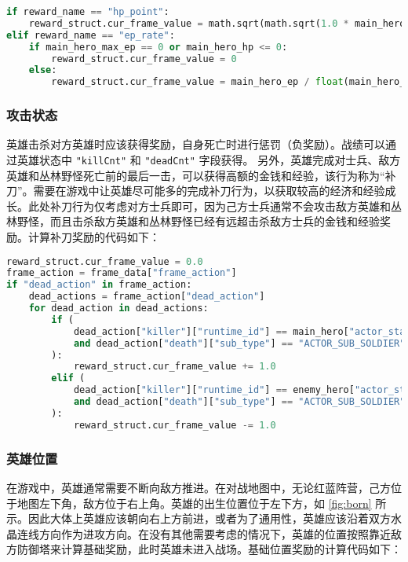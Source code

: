 \begin{lstlisting}[language=Python]
if reward_name == "hp_point":
    reward_struct.cur_frame_value = math.sqrt(math.sqrt(1.0 * main_hero_hp / main_hero_max_hp))
elif reward_name == "ep_rate":
    if main_hero_max_ep == 0 or main_hero_hp <= 0:
        reward_struct.cur_frame_value = 0
    else:
        reward_struct.cur_frame_value = main_hero_ep / float(main_hero_max_ep)
\end{lstlisting}

\subsubsection{攻击状态}

英雄击杀对方英雄时应该获得奖励，自身死亡时进行惩罚（负奖励）。战绩可以通过英雄状态中 \verb|"killCnt"| 和 \verb|"deadCnt"| 字段获得。
另外，英雄完成对士兵、敌方英雄和丛林野怪死亡前的最后一击，可以获得高额的金钱和经验，该行为称为“补刀”。需要在游戏中让英雄尽可能多的完成补刀行为，以获取较高的经济和经验成长。此处补刀行为仅考虑对方士兵即可，因为己方士兵通常不会攻击敌方英雄和丛林野怪，而且击杀敌方英雄和丛林野怪已经有远超击杀敌方士兵的金钱和经验奖励。计算补刀奖励的代码如下：

\begin{lstlisting}[language=Python]
reward_struct.cur_frame_value = 0.0
frame_action = frame_data["frame_action"]
if "dead_action" in frame_action:
    dead_actions = frame_action["dead_action"]
    for dead_action in dead_actions:
        if (
            dead_action["killer"]["runtime_id"] == main_hero["actor_state"]["runtime_id"]
            and dead_action["death"]["sub_type"] == "ACTOR_SUB_SOLDIER"
        ):
            reward_struct.cur_frame_value += 1.0
        elif (
            dead_action["killer"]["runtime_id"] == enemy_hero["actor_state"]["runtime_id"]
            and dead_action["death"]["sub_type"] == "ACTOR_SUB_SOLDIER"
        ):
            reward_struct.cur_frame_value -= 1.0
\end{lstlisting}

\subsubsection{英雄位置}


在游戏中，英雄通常需要不断向敌方推进。在对战地图中，无论红蓝阵营，己方位于地图左下角，敌方位于右上角。英雄的出生位置位于左下方，如 \cref{fig:born} 所示。因此大体上英雄应该朝向右上方前进，或者为了通用性，英雄应该沿着双方水晶连线方向作为进攻方向。在没有其他需要考虑的情况下，英雄的位置按照靠近敌方防御塔来计算基础奖励，此时英雄未进入战场。基础位置奖励的计算代码如下：

